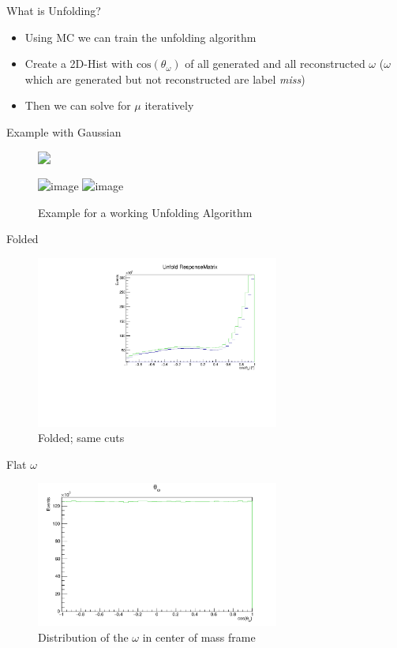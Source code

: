 \documentclass[
		10pt
		]{beamer}
\begin{document}
\iffalse


\begin{frame}{What is Unfolding?} 
\begin{itemize} 
		\item  Using MC we can train the unfolding algorithm
		\item Create a 2D-Hist with $ \textrm{cos}(\theta_{\omega}) $ of all generated and all reconstructed $\omega$ ($\omega$ which are generated but not reconstructed are label \textit{miss})
		\item Then we can solve for $\mu$ iteratively	
	\end{itemize}

\end{frame}


\begin{frame}{Example with Gaussian}
	
\begin{figure}
	\includegraphics<1>[width=8cm]{Plots/truth}

	\includegraphics<2>[width=8cm]{Plots/meas_truth}
	\includegraphics<3>[width=8cm]{Plots/folded}
	\captionsetup{labelformat=empty}
	\caption{Example for a working Unfolding Algorithm}
\end{figure}
	
	
\end{frame}




\begin{frame}{Folded}
	\begin{figure}
		\includegraphics[width=8cm]{Plots/WholeUnfold35.pdf}
		\captionsetup{labelformat=empty}
		\caption{Folded; same cuts}
	\end{figure}
\end{frame}

\begin{frame}{Flat $\omega$}
	\begin{figure}
		\includegraphics[width=8cm]{Plots/OmegaFlat.pdf}
		\captionsetup{labelformat=empty}
		\caption{Distribution of the $\omega$ in center of mass frame}
	\end{figure}
\end{frame}
\end{document}
